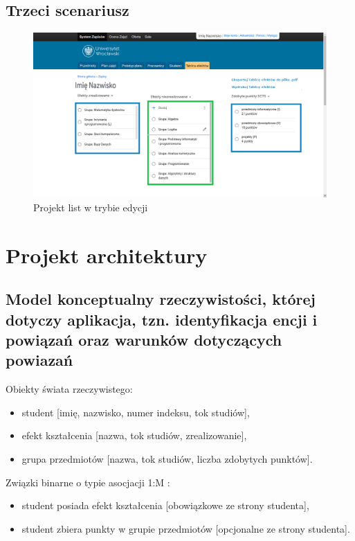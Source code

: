 \documentclass{article}
\begin{document}
\subsection{Trzeci scenariusz}
\begin{figure}[H]
	\begin{center}
		\caption{Projekt list w trybie edycji}
		\includegraphics[scale=0.23]{edycja.png}
	\end{center}
\end{figure}


\section{Projekt architektury}

\subsection{Model konceptualny rzeczywistości, której dotyczy aplikacja, tzn. identyfikacja encji i powiązań oraz warunków dotyczących powiazań}
Obiekty świata rzeczywistego:
\begin{itemize}
 \item student [imię, nazwisko, numer indeksu, tok studiów],
 \item efekt kształcenia [nazwa, tok studiów, zrealizowanie],
 \item grupa przedmiotów [nazwa, tok studiów, liczba zdobytych punktów].
\end{itemize}
Związki binarne o typie asocjacji 1:M :
\begin{itemize}
 \item student posiada efekt kształcenia [obowiązkowe ze strony studenta],
 \item student zbiera punkty w grupie przedmiotów [opcjonalne ze strony studenta].
\end{itemize}
\end{document}
